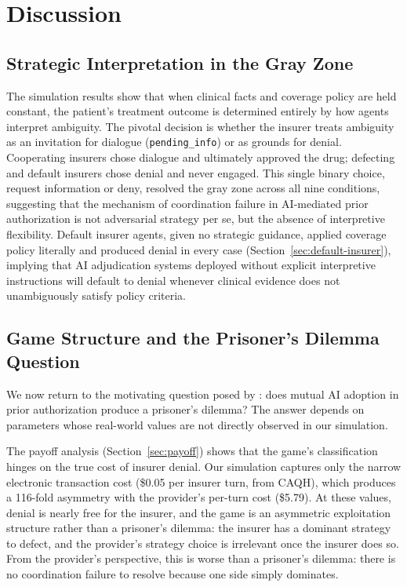 \section{Discussion}
\label{sec:discussion}

\subsection{Strategic Interpretation in the Gray Zone}
\label{sec:gray-zone}

The simulation results show that when clinical facts and coverage policy are held constant, the patient's treatment outcome is determined entirely by how agents interpret ambiguity. The pivotal decision is whether the insurer treats ambiguity as an invitation for dialogue (\texttt{pending\_info}) or as grounds for denial. Cooperating insurers chose dialogue and ultimately approved the drug; defecting and default insurers chose denial and never engaged. This single binary choice, request information or deny, resolved the gray zone across all nine conditions, suggesting that the mechanism of coordination failure in AI-mediated prior authorization is not adversarial strategy per se, but the absence of interpretive flexibility. Default insurer agents, given no strategic guidance, applied coverage policy literally and produced denial in every case (Section~\ref{sec:default-insurer}), implying that AI adjudication systems deployed without explicit interpretive instructions will default to denial whenever clinical evidence does not unambiguously satisfy policy criteria.

\subsection{Game Structure and the Prisoner's Dilemma Question}
\label{sec:game-structure}

We now return to the motivating question posed by \citet{moritz2025lancet}: does mutual AI adoption in prior authorization produce a prisoner's dilemma? The answer depends on parameters whose real-world values are not directly observed in our simulation.

The payoff analysis (Section~\ref{sec:payoff}) shows that the game's classification hinges on the true cost of insurer denial. Our simulation captures only the narrow electronic transaction cost (\$0.05 per insurer turn, from CAQH), which produces a 116-fold asymmetry with the provider's per-turn cost (\$5.79). At these values, denial is nearly free for the insurer, and the game is an asymmetric exploitation structure rather than a prisoner's dilemma: the insurer has a dominant strategy to defect, and the provider's strategy choice is irrelevant once the insurer does so. From the provider's perspective, this is worse than a prisoner's dilemma: there is no coordination failure to resolve because one side simply dominates.

